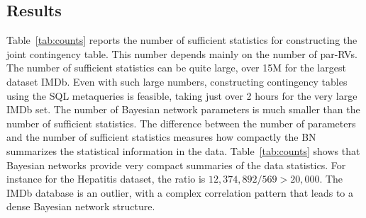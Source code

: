 \documentclass{IEEEtran}
\begin{document}
\subsection{Results}
Table~\ref{tab:counts} reports the number of sufficient statistics for constructing the joint contingency table. This number depends mainly on the number of par-RVs. The number of sufficient statistics can be quite large, over 15M for the largest dataset IMDb. 
Even with such large numbers, constructing contingency tables using the SQL metaqueries is feasible, taking just over 2 hours for the very large IMDb set. 
The number of Bayesian network parameters is much smaller than the number of sufficient statistics.
The difference between the number of parameters and the number of sufficient statistics measures how compactly the BN summarizes the statistical information in the data. %
Table~\ref{tab:counts} shows that Bayesian networks provide very compact summaries of the data statistics. For instance for the Hepatitis dataset, the ratio is  $12,374,892/569 > 20,000$. The IMDb database is an outlier, with a complex correlation pattern that leads to a dense Bayesian network structure.
\end{document}
